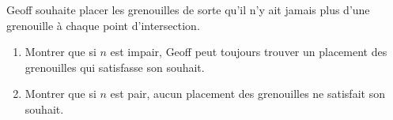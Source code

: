 Geoff souhaite placer les grenouilles de sorte qu'il n'y ait jamais plus d'une grenouille à chaque point
d'intersection.
\begin{enumerate}
  \item[(a)] Montrer que si $n$ est impair, Geoff peut toujours trouver un placement des grenouilles qui
  satisfasse son souhait.
  \item[(b)] Montrer que si $n$ est pair, aucun placement des grenouilles ne satisfait son souhait.
\end{enumerate}
